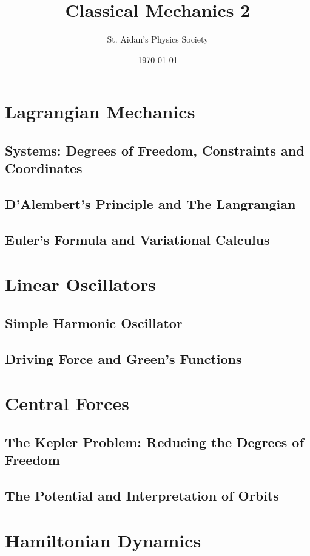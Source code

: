 \documentclass[12pt,%
               a4paper]{physics_notes}
\begin{document}
\title{Classical Mechanics 2}
\author{St. Aidan's Physics Society}
\date{\today}
\maketitle

\tableofcontents
\newpage

\section{Lagrangian Mechanics}
\subsection{Systems: Degrees of Freedom, Constraints and Coordinates}
\subsection{D'Alembert's Principle and The Langrangian}
\subsection{Euler's Formula and Variational Calculus}

\section{Linear Oscillators}
\subsection{Simple Harmonic Oscillator}
\subsection{Driving Force and Green's Functions}

\section{Central Forces}
\subsection{The Kepler Problem: Reducing the Degrees of Freedom}
\subsection{The Potential and Interpretation of Orbits}

\section{Hamiltonian Dynamics}
\end{document}
